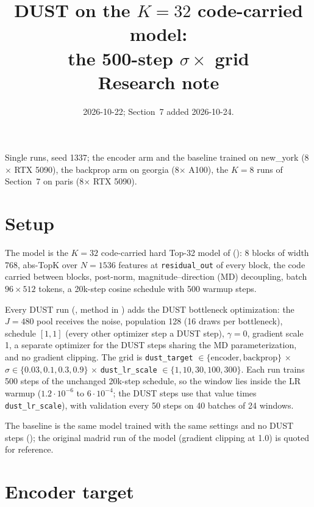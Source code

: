 \documentclass[11pt,a4paper]{article}
\title{DUST on the $K{=}32$ code-carried model:\\ the 500-step $\sigma \times$ \code{dust\_lr\_scale} grid\\[2pt]
\large Research note}
\author{}
\date{2026-10-22; Section~7 added 2026-10-24.}
\newcommand{\code}[1]{\texttt{#1}}
\begin{document}
\maketitle
\vspace{-2em}

Single runs, seed 1337; the encoder arm and the baseline trained on new\_york
(8$\times$ RTX 5090), the backprop arm on georgia (8$\times$ A100), the $K = 8$
runs of Section~7 on paris (8$\times$ RTX 5090).

\section{Setup}

The model is the $K{=}32$ code-carried hard Top-32 model of
(): 8 blocks of width 768,
abs-TopK over $N = 1536$ features at \code{residual\_out} of every block, the
code carried between blocks, post-norm, magnitude--direction (MD) decoupling,
batch $96 \times 512$ tokens, a 20k-step cosine schedule with 500 warmup steps.

Every DUST run (, method in
) adds the DUST bottleneck optimization: the $J = 480$
pool receives the noise, population 128 (16 draws per bottleneck), schedule
$[1, 1]$ (every other optimizer step a DUST step), $\gamma = 0$, gradient
scale 1, a separate optimizer for the DUST steps sharing the MD
parameterization, and no gradient clipping. The grid is \code{dust\_target}
$\in \{\text{encoder}, \text{backprop}\}$ $\times$ $\sigma \in \{0.03, 0.1, 0.3,
0.9\}$ $\times$ \code{dust\_lr\_scale} $\in \{1, 10, 30, 100, 300\}$. Each run
trains 500 steps of the unchanged 20k-step schedule, so the window lies inside
the LR warmup ($1.2 \cdot 10^{-6}$ to $6 \cdot 10^{-4}$; the DUST steps use that
value times \code{dust\_lr\_scale}), with validation every 50 steps on 40
batches of 24 windows.

The baseline is the same model trained with the same settings and no DUST
steps (); the original madrid run of the model
(gradient clipping at 1.0) is quoted for reference.

\section{Encoder target}
\end{document}
